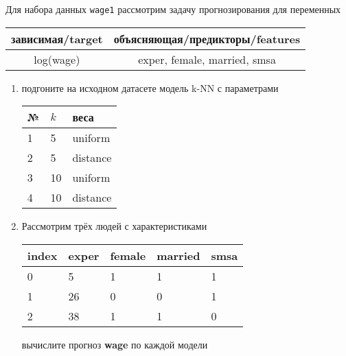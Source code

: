 \begin{exercise}
Для набора данных \texttt{wage1} рассмотрим задачу прогнозирования
для переменных
\begin{center}
	\begin{tabular}{|c|c|}\hline
		зависимая/target & объясняющая/предикторы/features \\ \hline
		log(wage) & exper, female, married, smsa \\ \hline
	\end{tabular}
\end{center}
\begin{enumerate}
	\item подгоните на исходном датасете модель k-NN с параметрами
	\begin{center}
		\begin{tabular}{|l|l|l|}\hline
		№ & \(k\) & веса \\ \hline
		1 & 5 & uniform \\
		2 & 5 & distance \\
		3 & 10 & uniform \\
		4 & 10 & distance \\ \hline
		\end{tabular}
	\end{center}
	\item Рассмотрим трёх людей с характеристиками
	\begin{center}
		\begin{tabular}{|l||l|l|l|l|}\hline
			index & exper & female & married & smsa \\ \hline\hline
			0 & 5 & 1 & 1 & 1  \\
			1 & 26 & 0 & 0 & 1 \\
			2 & 38 & 1 & 1 & 0 \\ \hline
		\end{tabular}
	\end{center}
	вычислите прогноз \textbf{wage} по каждой модели
\end{enumerate}
\end{exercise}

